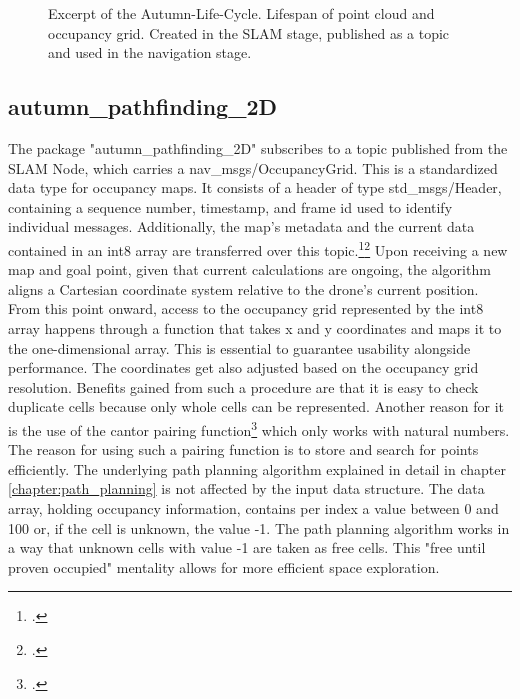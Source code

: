 \begin{figure}[h]
	\centering
	
	\caption{Excerpt of the Autumn-Life-Cycle. Lifespan of point cloud and occupancy grid. Created in the SLAM stage, published as a topic and used in the navigation stage.}
	\label{fig:abstract_environments_enviromentTransfer}
\end{figure}

\subsection{autumn\_pathfinding\_2D}
The package "autumn\_pathfinding\_2D" subscribes to a topic published from the SLAM Node, which carries a nav\_msgs/OccupancyGrid. This is a standardized data type for occupancy maps. It consists of a header of type std\_msgs/Header, containing a sequence number, timestamp, and frame id used to identify individual messages. Additionally, the map's metadata and the current data contained in an int8 array are transferred over this topic.\footcite{rosNavMsgsOccupancyGrid2021}\footcite{rosStdMsgsHeader2021}\newline
Upon receiving a new map and goal point, given that current calculations are ongoing, the algorithm aligns a Cartesian coordinate system relative to the drone's current position. From this point onward, access to the occupancy grid represented by the int8 array happens through a function that takes x and y coordinates and maps it to the one-dimensional array. This is essential to guarantee usability alongside performance.\newline
The coordinates get also adjusted based on the occupancy grid resolution. Benefits gained from such a procedure are that it is easy to check duplicate cells because only whole cells can be represented. Another reason for it is the use of the cantor pairing function\footcite{Szudzik2017} which only works with natural numbers. The reason for using such a pairing function is to store and search for points efficiently.  
The underlying path planning algorithm explained in detail in chapter \ref{chapter:path_planning} is not affected by the input data structure.       
The data array, holding occupancy information, contains per index a value between 0 and 100 or, if the cell is unknown, the value -1. The path planning algorithm works in a way that unknown cells with value -1 are taken as free cells. This "free until proven occupied" mentality allows for more efficient space exploration.

